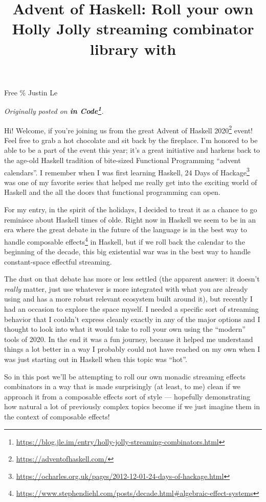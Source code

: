 \documentclass[]{article}
\title{Advent of Haskell: Roll your own Holly Jolly streaming combinator library with}
\renewcommand{\href}[2]{#2\footnote{\url{#1}}}
\begin{document}
\maketitle

Free \% Justin Le

\emph{Originally posted on
\textbf{\href{https://blog.jle.im/entry/holly-jolly-streaming-combinators.html}{in
Code}}.}

Hi! Welcome, if you're joining us from the great
\href{https://adventofhaskell.com/}{Advent of Haskell 2020} event! Feel free to
grab a hot chocolate and sit back by the fireplace. I'm honored to be able to be
a part of the event this year; it's a great initiative and harkens back to the
age-old Haskell tradition of bite-sized Functional Programming ``advent
calendars''. I remember when I was first learning Haskell,
\href{https://ocharles.org.uk/pages/2012-12-01-24-days-of-hackage.html}{24 Days
of Hackage} was one of my favorite series that helped me really get into the
exciting world of Haskell and the all the doors that functional programming can
open.

For my entry, in the spirit of the holidays, I decided to treat it as a chance
to go reminisce about Haskell times of olde. Right now in Haskell we seem to be
in an era where the great debate in the future of the language is in
\href{https://www.stephendiehl.com/posts/decade.html\#algebraic-effect-systems}{the
best way to handle composable effects} in Haskell, but if we roll back the
calendar to the beginning of the decade, this big existential war was in the
best way to handle constant-space effectful streaming.

The dust on that debate has more or less settled (the apparent answer: it
doesn't \emph{really} matter, just use whatever is more integrated with what you
are already using and has a more robust relevant ecosystem built around it), but
recently I had an occasion to explore the space myself. I needed a specific sort
of streaming behavior that I couldn't express cleanly exactly in any of the
major options and I thought to look into what it would take to roll your own
using the ``modern'' tools of 2020. In the end it was a fun journey, because it
helped me understand things a lot better in a way I probably could not have
reached on my own when I was just starting out in Haskell when this topic was
``hot''.

So in this post we'll be attempting to roll our own monadic streaming effects
combinators in a way that is made surprisingly (at least, to me) clean if we
approach it from a composable effects sort of style --- hopefully demonstrating
how natural a lot of previously complex topics become if we just imagine them in
the context of composable effects!
\end{document}
